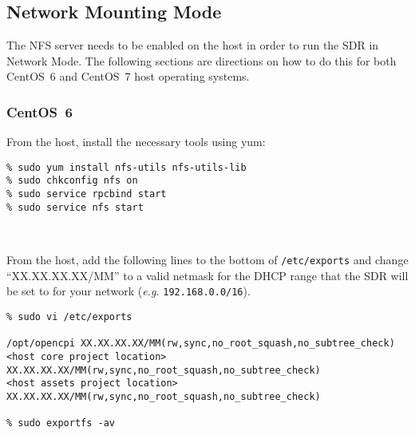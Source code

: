 \iffalse
This file is protected by Copyright. Please refer to the COPYRIGHT file
distributed with this source distribution.

This file is part of OpenCPI <http://www.opencpi.org>

OpenCPI is free software: you can redistribute it and/or modify it under the
terms of the GNU Lesser General Public License as published by the Free Software
Foundation, either version 3 of the License, or (at your option) any later
version.

OpenCPI is distributed in the hope that it will be useful, but WITHOUT ANY
WARRANTY; without even the implied warranty of MERCHANTABILITY or FITNESS FOR A
PARTICULAR PURPOSE. See the GNU Lesser General Public License for more details.

You should have received a copy of the GNU Lesser General Public License along
with this program. If not, see <http://www.gnu.org/licenses/>.
\fi

\newlength{\savedparindentnfs}%
\setlength{\savedparindentnfs}{\parindent}%
\setlength{\parindent}{0pt} %
\providecommand{\forceindent}{\leavevmode{\parindent=1em\indent}}%

\subsection{Network Mounting Mode}
\label{sec:network_mode}
The NFS server needs to be enabled on the host in order to run the SDR in Network Mode. The following sections are directions on how to do this for both CentOS~6 and CentOS~7 host operating systems.
\subsubsection{CentOS~6}
\begin{minipage}{\linewidth}
From the host, install the necessary tools using yum:
\begin{verbatim}
% sudo yum install nfs-utils nfs-utils-lib
% sudo chkconfig nfs on
% sudo service rpcbind start
% sudo service nfs start
\end{verbatim}
\end{minipage}
~\\

\begin{minipage}{\linewidth}
From the host, add the following lines to the bottom of \texttt{/etc/exports} and change ``XX.XX.XX.XX/MM'' to a valid netmask for the DHCP range that the SDR will be set to for your network (\textit{e.g.} \texttt{192.168.0.0/16}).
\begin{verbatim}
% sudo vi /etc/exports

/opt/opencpi XX.XX.XX.XX/MM(rw,sync,no_root_squash,no_subtree_check)
<host core project location> XX.XX.XX.XX/MM(rw,sync,no_root_squash,no_subtree_check)
<host assets project location> XX.XX.XX.XX/MM(rw,sync,no_root_squash,no_subtree_check)

% sudo exportfs -av
\end{verbatim}
\end{minipage}
~\\

